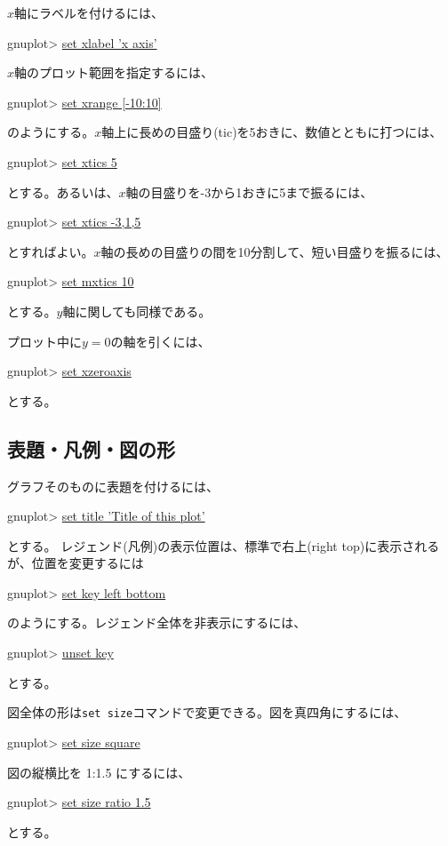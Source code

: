 \(x\)軸にラベルを付けるには、
\begin{commandline2}
    gnuplot> \underline{set xlabel 'x axis'}
\end{commandline2} \noindent
\(x\)軸のプロット範囲を指定するには、
\begin{commandline2}
    gnuplot> \underline{set xrange [-10:10]}
\end{commandline2} \noindent
のようにする。\(x\)軸上に長めの目盛り(tic)を5おきに、数値とともに打つには、
\begin{commandline2}
    gnuplot> \underline{set xtics 5}
\end{commandline2} \noindent
とする。あるいは、\(x\)軸の目盛りを-3から1おきに5まで振るには、
\begin{commandline2}
    gnuplot> \underline{set xtics -3,1,5}
\end{commandline2} \noindent
とすればよい。\(x\)軸の長めの目盛りの間を10分割して、短い目盛りを振るには、
\begin{commandline2}
    gnuplot> \underline{set mxtics 10}
\end{commandline2} \noindent
とする。\(y\)軸に関しても同様である。

プロット中に\(y=0\)の軸を引くには、
\begin{commandline2}
    gnuplot> \underline{set xzeroaxis}
\end{commandline2} \noindent
とする。

\subsection{表題・凡例・図の形}

グラフそのものに表題を付けるには、
\begin{commandline2}
    gnuplot> \underline{set title 'Title of this plot'}
\end{commandline2} \noindent
とする。
レジェンド(凡例)の表示位置は、標準で右上(right top)に表示されるが、位置を変更するには
\begin{commandline2}
    gnuplot> \underline{set key left bottom}
\end{commandline2} \noindent
のようにする。レジェンド全体を非表示にするには、
\begin{commandline2}
    gnuplot> \underline{unset key}
\end{commandline2} \noindent
とする。

図全体の形は\texttt{set size}コマンドで変更できる。図を真四角にするには、
\begin{commandline2}
    gnuplot> \underline{set size square}
\end{commandline2} \noindent
図の縦横比を 1:1.5 にするには、
\begin{commandline2}
    gnuplot> \underline{set size ratio 1.5}
\end{commandline2} \noindent
とする。

